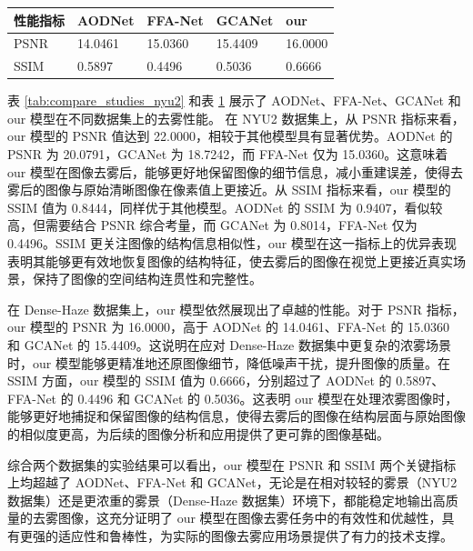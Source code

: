 \begin{table}[H]
    \centering
    \captionsetup{font=footnotesize}
    \label{tab:compare_studies_dh}
    \begin{tabular}{p{}p{}p{}p{}p{}}
        \toprule
        性能指标 & AODNet  & FFA-Net & GCANet  & our   \\ 
        \midrule
        PSNR    & 14.0461 & 15.0360 & 15.4409 & 16.0000 \\
        SSIM    & 0.5897  & 0.4496  & 0.5036  & 0.6666 \\
        \bottomrule
    \end{tabular}
\end{table}

表 \ref{tab:compare_studies_nyu2} 和表 \ref{tab:compare_studies_dh} 展示了 AODNet、FFA-Net、GCANet 和 our 模型在不同数据集上的去雾性能。
在 NYU2 数据集上，从 PSNR 指标来看，our 模型的 PSNR 值达到 22.0000，相较于其他模型具有显著优势。AODNet 的 PSNR 为 20.0791，GCANet 为 18.7242，而 FFA-Net 仅为 15.0360。这意味着 our 模型在图像去雾后，能够更好地保留图像的细节信息，减小重建误差，使得去雾后的图像与原始清晰图像在像素值上更接近。从 SSIM 指标来看，our 模型的 SSIM 值为 0.8444，同样优于其他模型。AODNet 的 SSIM 为 0.9407，看似较高，但需要结合 PSNR 综合考量，而 GCANet 为 0.8014，FFA-Net 仅为 0.4496。SSIM 更关注图像的结构信息相似性，our 模型在这一指标上的优异表现表明其能够更有效地恢复图像的结构特征，使去雾后的图像在视觉上更接近真实场景，保持了图像的空间结构连贯性和完整性。

在 Dense-Haze 数据集上，our 模型依然展现出了卓越的性能。对于 PSNR 指标，our 模型的 PSNR 为 16.0000，高于 AODNet 的 14.0461、FFA-Net 的 15.0360 和 GCANet 的 15.4409。这说明在应对 Dense-Haze 数据集中更复杂的浓雾场景时，our 模型能够更精准地还原图像细节，降低噪声干扰，提升图像的质量。在 SSIM 方面，our 模型的 SSIM 值为 0.6666，分别超过了 AODNet 的 0.5897、FFA-Net 的 0.4496 和 GCANet 的 0.5036。这表明 our 模型在处理浓雾图像时，能够更好地捕捉和保留图像的结构信息，使得去雾后的图像在结构层面与原始图像的相似度更高，为后续的图像分析和应用提供了更可靠的图像基础。

综合两个数据集的实验结果可以看出，our 模型在 PSNR 和 SSIM 两个关键指标上均超越了 AODNet、FFA-Net 和 GCANet，无论是在相对较轻的雾景（NYU2 数据集）还是更浓重的雾景（Dense-Haze 数据集）环境下，都能稳定地输出高质量的去雾图像，这充分证明了 our 模型在图像去雾任务中的有效性和优越性，具有更强的适应性和鲁棒性，为实际的图像去雾应用场景提供了有力的技术支撑。

